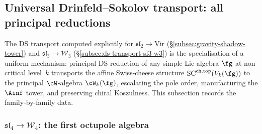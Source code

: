 
\subsection{Universal Drinfeld--Sokolov transport:
all principal reductions}
\label{subsec:universal-ds-transport}

The DS transport computed explicitly for
$\mathfrak{sl}_2 \to \mathrm{Vir}$ (\S\ref{subsec:gravity-shadow-tower})
and $\mathfrak{sl}_3 \to \mathcal{W}_3$ (\S\ref{subsec:ds-transport-sl3-w3})
is the specialisation of a uniform mechanism:
principal DS reduction of any simple Lie algebra $\fg$ at non-critical
level~$k$ transports the affine Swiss-cheese structure
$\mathrm{SC}^{\mathrm{ch,top}}(V_k(\fg))$ to the principal $\cW$-algebra
$\cW_k(\fg)$, escalating the pole order, manufacturing the $\Ainf$ tower,
and preserving chiral Koszulness. This subsection records the
family-by-family data.

\subsubsection{$\mathfrak{sl}_4 \to \mathcal{W}_4$:
the first octupole algebra}
\label{subsubsec:ds-sl4-w4}

